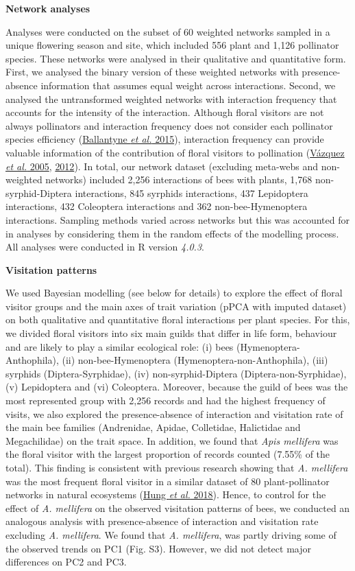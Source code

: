 \documentclass[
  12pt,
  a4paper,
]{article}
\begin{document}
\textbf{Network analyses}

Analyses were conducted on the subset of 60 weighted networks sampled in a unique flowering season and site, which included 556 plant and 1,126 pollinator species. These networks were analysed in their qualitative and quantitative form. First, we analysed the binary version of these weighted networks with presence-absence information that assumes equal weight across interactions. Second, we analysed the untransformed weighted networks with interaction frequency that accounts for the intensity of the interaction. Although floral visitors are not always pollinators and interaction frequency does not consider each pollinator species efficiency (\protect\hyperlink{ref-ballantyne2015}{Ballantyne \emph{et al.} 2015}), interaction frequency can provide valuable information of the contribution of floral visitors to pollination (\protect\hyperlink{ref-vazquez2005}{Vázquez \emph{et al.} 2005}, \protect\hyperlink{ref-vazquez2012}{2012}). In total, our network dataset (excluding meta-webs and non-weighted networks) included 2,256 interactions of bees with plants, 1,768 non-syrphid-Diptera interactions, 845 syrphids interactions, 437 Lepidoptera interactions, 432 Coleoptera interactions and 362 non-bee-Hymenoptera interactions. Sampling methods varied across networks but this was accounted for in analyses by considering them in the random effects of the modelling process. All analyses were conducted in R version \emph{4.0.3}.

\textbf{Visitation patterns}

We used Bayesian modelling (see below for details) to explore the effect of floral visitor groups and the main axes of trait variation (pPCA with imputed dataset) on both qualitative and quantitative floral interactions per plant species. For this, we divided floral visitors into six main guilds that differ in life form, behaviour and are likely to play a similar ecological role: (i) bees (Hymenoptera-Anthophila), (ii) non-bee-Hymenoptera (Hymenoptera-non-Anthophila), (iii) syrphids (Diptera-Syrphidae), (iv) non-syrphid-Diptera (Diptera-non-Syrphidae), (v) Lepidoptera and (vi) Coleoptera. Moreover, because the guild of bees was the most represented group with 2,256 records and had the highest frequency of visits, we also explored the presence-absence of interaction and visitation rate of the main bee families (Andrenidae, Apidae, Colletidae, Halictidae and Megachilidae) on the trait space. In addition, we found that \emph{Apis mellifera} was the floral visitor with the largest proportion of records counted (7.55\% of the total). This finding is consistent with previous research showing that \emph{A. mellifera} was the most frequent floral visitor in a similar dataset of 80 plant-pollinator networks in natural ecosystems (\protect\hyperlink{ref-hung2018}{Hung \emph{et al.} 2018}). Hence, to control for the effect of \emph{A. mellifera} on the observed visitation patterns of bees, we conducted an analogous analysis with presence-absence of interaction and visitation rate excluding \emph{A. mellifera}. We found that \emph{A. mellifera}, was partly driving some of the observed trends on PC1 (Fig. S3). However, we did not detect major differences on PC2 and PC3.
\end{document}
